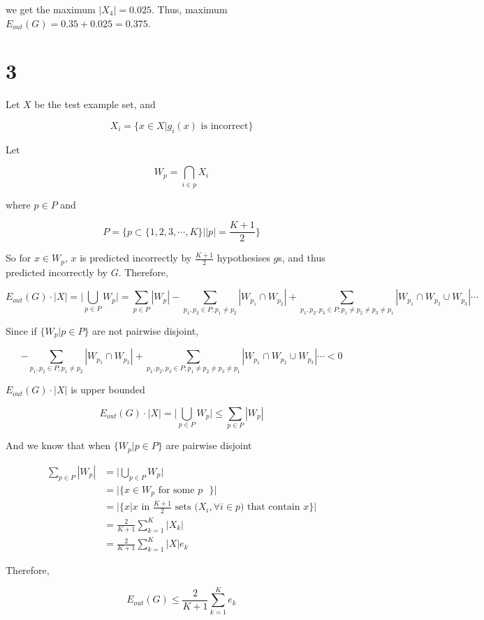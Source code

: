 \documentclass[fleqn,a4paper,12pt]{article}
\begin{document}
we get the maximum $|X_4| = 0.025$. Thus, maximum $E_{out}(G) = 0.35 + 0.025 = 0.375$.

\section*{3}

Let $X$ be the test example set, and

\begin{equation*}
  X_i = \{x \in X | \text{$g_i(x)$ is incorrect} \}
\end{equation*}

Let

\begin{equation*}
  W_p = \bigcap_{i \in p} X_i
\end{equation*}

where $p \in P$ and

\begin{equation*}
  P = \{ p \subset \{1, 2, 3, \cdots, K\} | |p| = \frac{K + 1}{2} \}
\end{equation*}

So for $x \in W_p$, $x$ is predicted incorrectly by $\frac{K + 1}{2}$ hypothesises $g$s, and thus predicted incorrectly by $G$. Therefore,

\begin{equation*}
  E_{out}(G) \cdot |X| = \lvert \bigcup_{p \in P} W_p \rvert = \sum_{p \in P} |W_p| - \sum_{p_1, p_2 \in P; p_1 \ne p_2} |W_{p_1} \cap W_{p_2}| + \sum_{p_1, p_2, p_3 \in P; p_1 \ne p_2 \ne p_3 \ne p_1} |W_{p_1} \cap W_{p_2} \cup W_{p_3}| \cdots
\end{equation*}

Since if $\{ W_p | p \in P\}$ are not pairwise disjoint,

\begin{equation*}
- \sum_{p_1, p_2 \in P; p_1 \ne p_2} |W_{p_1} \cap W_{p_2}| + \sum_{p_1, p_2, p_3 \in P; p_1 \ne p_2 \ne p_3 \ne p_1} |W_{p_1} \cap W_{p_2} \cup W_{p_3}| \cdots < 0
\end{equation*}

$E_{out}(G) \cdot |X|$ is upper bounded

\begin{equation*}
  E_{out}(G) \cdot |X| = \lvert \bigcup_{p \in P} W_p \rvert \leq \sum_{p \in P} |W_p| 
\end{equation*}

And we know that when $\{ W_p | p \in P\}$ are pairwise disjoint

\begin{align*}
  \sum_{p \in P} |W_p|
  &= \lvert \bigcup_{p \in P} W_p \rvert \\
  &= \lvert \{ x \in W_p \text{ for some $p$ } \} \rvert \\
  &= \lvert \{ x | \text{$x$ in $\frac{K + 1}{2}$ sets ($X_i, \forall i \in p$) that contain $x$} \} \rvert \\
  &= \frac{2}{K + 1} \sum_{k=1}^{K} |X_k| \\
  &= \frac{2}{K + 1} \sum_{k=1}^{K} |X| e_k
\end{align*}


Therefore,

\begin{equation*}
  E_{out}(G) \leq \frac{2}{K + 1} \sum_{k=1}^{K} e_k
\end{equation*}
\end{document}
